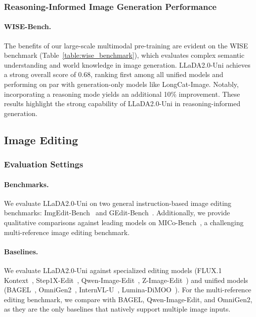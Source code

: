 \subsubsection{Reasoning-Informed Image Generation Performance}
\paragraph{WISE-Bench.} 
The benefits of our large-scale multimodal pre-training are evident on the WISE benchmark (Table~\ref{table:wise_benchmark}), which evaluates complex semantic understanding and world knowledge in image generation.
%
LLaDA2.0-Uni achieves a strong overall score of 0.68, ranking first among all unified models and performing on par with generation-only models like LongCat-Image.
%
%
Notably, incorporating a reasoning mode yields an additional 10\% improvement. 
%
These results highlight the strong capability of LLaDA2.0-Uni in reasoning-informed generation.








\subsection{Image Editing}
\subsubsection{Evaluation Settings}
\paragraph{Benchmarks.}
We evaluate LLaDA2.0-Uni on two general instruction-based image editing benchmarks: ImgEdit-Bench~\citep{ye2025imgedit} and GEdit-Bench~\citep{liu2025step1x-edit}. 
%
Additionally, we provide qualitative comparisons against leading models on MICo-Bench~\citep{wei2025mico}, a challenging multi-reference image editing benchmark.

\paragraph{Baselines.} 
We evaluate LLaDA2.0-Uni against specialized editing models (FLUX.1 Kontext~\citep{labs2025flux1kontextflowmatching}, Step1X-Edit~\citep{liu2025step1x-edit}, Qwen-Image-Edit~\citep{wu2025qwen}, Z-Image-Edit~\citep{cai2025z}) and unified models (BAGEL~\citep{bagel}, OmniGen2~\citep{wu2025omnigen2}, InternVL-U~\citep{tian2026internvl}, Lumina-DiMOO~\citep{dimoo}).
%
For the multi-reference editing benchmark, we compare with BAGEL, Qwen-Image-Edit, and OmniGen2, as they are the only baselines that natively support multiple image inputs.




